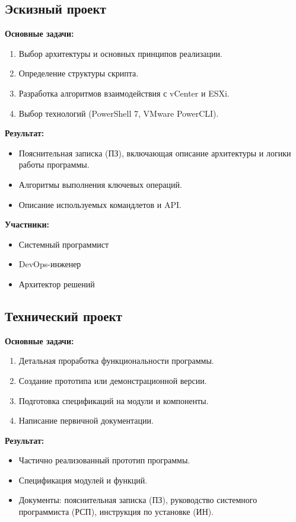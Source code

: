 \subsection{Эскизный проект}

\textbf{Основные задачи:}
\begin{enumerate}
    \item Выбор архитектуры и основных принципов реализации.
    \item Определение структуры скрипта.
    \item Разработка алгоритмов взаимодействия с vCenter и ESXi.
    \item Выбор технологий (PowerShell 7, VMware PowerCLI).
\end{enumerate}

\textbf{Результат:}
\begin{itemize}
    \item Пояснительная записка (ПЗ), включающая описание архитектуры и логики работы программы.
    \item Алгоритмы выполнения ключевых операций.
    \item Описание используемых командлетов и API.
\end{itemize}

\textbf{Участники:}
\begin{itemize}
    \item Системный программист
    \item DevOps-инженер
    \item Архитектор решений
\end{itemize}

\subsection{Технический проект}

\textbf{Основные задачи:}
\begin{enumerate}
    \item Детальная проработка функциональности программы.
    \item Создание прототипа или демонстрационной версии.
    \item Подготовка спецификаций на модули и компоненты.
    \item Написание первичной документации.
\end{enumerate}

\textbf{Результат:}
\begin{itemize}
    \item Частично реализованный прототип программы.
    \item Спецификация модулей и функций.
    \item Документы: пояснительная записка (ПЗ), руководство системного программиста (РСП), инструкция по установке (ИН).
\end{itemize}

